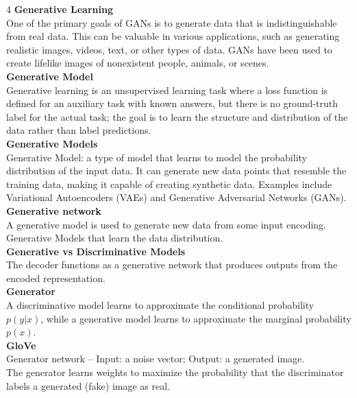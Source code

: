 \documentclass[8pt]{extarticle}
\begin{document}
\begin{multicols}{4}
\vspace{2pt}\textbf{Generative Learning}\\
One of the primary goals of GANs is to generate data that is indistinguishable from real data. This can be valuable in various applications, such as generating realistic images, videos, text, or other types of data. GANs have been used to create lifelike images of nonexistent people, animals, or scenes.\\
\vspace{2pt}\textbf{Generative Model}\\
Generative learning is an unsupervised learning task where a loss function is defined for an auxiliary task with known answers, but there is no ground-truth label for the actual task; the goal is to learn the structure and distribution of the data rather than label predictions.\\
\vspace{2pt}\textbf{Generative Models}\\
Generative Model: a type of model that learns to model the probability distribution of the input data. It can generate new data points that resemble the training data, making it capable of creating synthetic data. Examples include Variational Autoencoders (VAEs) and Generative Adversarial Networks (GANs).\\
\vspace{2pt}\textbf{Generative network}\\
A generative model is used to generate new data from some input encoding.\\
Generative Models that learn the data distribution.\\
\vspace{2pt}\textbf{Generative vs Discriminative Models}\\
The decoder functions as a generative network that produces outputs from the encoded representation.\\
\vspace{2pt}\textbf{Generator}\\
A discriminative model learns to approximate the conditional probability $p(y|x)$, while a generative model learns to approximate the marginal probability $ p(x)$.\\
\vspace{2pt}\textbf{GloVe}\\
Generator network -- Input: a noise vector; Output: a generated image.\\
The generator learns weights to maximize the probability that the discriminator labels a generated (fake) image as real.\\

\end{multicols}
\end{document}
